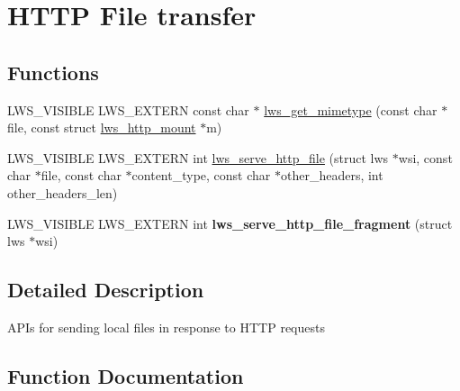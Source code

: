 \hypertarget{group__httpft}{}\section{H\+T\+TP File transfer}
\label{group__httpft}
\subsection*{Functions}
\begin{DoxyCompactItemize}
\item 
L\+W\+S\+\_\+\+V\+I\+S\+I\+B\+LE L\+W\+S\+\_\+\+E\+X\+T\+E\+RN const char $\ast$ \hyperlink{group__httpft_gab4da87a4800413f15e7aba649fb1d77c}{lws\+\_\+get\+\_\+mimetype} (const char $\ast$file, const struct \hyperlink{structlws__http__mount}{lws\+\_\+http\+\_\+mount} $\ast$m)
\item 
L\+W\+S\+\_\+\+V\+I\+S\+I\+B\+LE L\+W\+S\+\_\+\+E\+X\+T\+E\+RN int \hyperlink{group__httpft_gab393a06d3d2722af4c3f8b06842c80d7}{lws\+\_\+serve\+\_\+http\+\_\+file} (struct lws $\ast$wsi, const char $\ast$file, const char $\ast$content\+\_\+type, const char $\ast$other\+\_\+headers, int other\+\_\+headers\+\_\+len)
\item 
L\+W\+S\+\_\+\+V\+I\+S\+I\+B\+LE L\+W\+S\+\_\+\+E\+X\+T\+E\+RN int {\bfseries lws\+\_\+serve\+\_\+http\+\_\+file\+\_\+fragment} (struct lws $\ast$wsi)\hypertarget{group__httpft_ga29e1123f6d56cd777b3e5bf9ca40f9e5}{}\label{group__httpft_ga29e1123f6d56cd777b3e5bf9ca40f9e5}

\end{DoxyCompactItemize}


\subsection{Detailed Description}
A\+P\+Is for sending local files in response to H\+T\+TP requests 

\subsection{Function Documentation}
